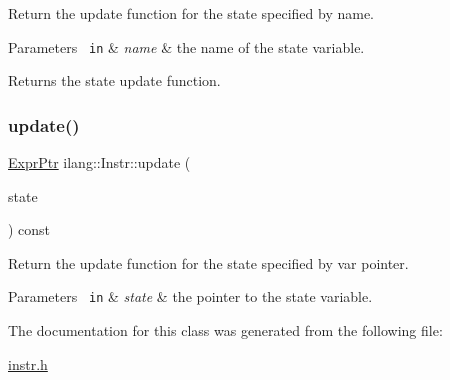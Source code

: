 Return the update function for the state specified by name. 


\begin{DoxyParams}[1]{Parameters}
\mbox{\texttt{ in}}  & {\em name} & the name of the state variable. \\
\hline
\end{DoxyParams}
\begin{DoxyReturn}{Returns}
the state update function. 
\end{DoxyReturn}
\mbox{\label{classilang_1_1_instr_a116a685b7132702f898f0f7a6f728382}} 
\subsubsection{\texorpdfstring{update()}{update()}\hspace{0.1cm}{\footnotesize\ttfamily [2/2]}}
{\footnotesize\ttfamily \mbox{\hyperlink{namespaceilang_a7c4196c72e53ea4df4b7861af7bc3bce}{Expr\+Ptr}} ilang\+::\+Instr\+::update (\begin{DoxyParamCaption}\item[{const \mbox{\hyperlink{namespaceilang_a7c4196c72e53ea4df4b7861af7bc3bce}{Expr\+Ptr}}}]{state }\end{DoxyParamCaption}) const}



Return the update function for the state specified by var pointer. 


\begin{DoxyParams}[1]{Parameters}
\mbox{\texttt{ in}}  & {\em state} & the pointer to the state variable. \\
\hline
\end{DoxyParams}


The documentation for this class was generated from the following file\+:\begin{DoxyCompactItemize}
\item 
\mbox{\hyperlink{instr_8h}{instr.\+h}}\end{DoxyCompactItemize}
